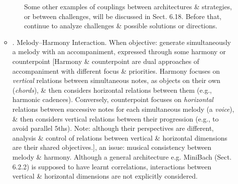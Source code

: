 \documentclass{article}
\begin{document}
\begin{itemize}
\begin{itemize}
\begin{itemize}
			Some other examples of couplings between architectures \& strategies, or between challenges, will be discussed in Sect. 6.18. Before that, continue to analyze challenges \& possible solutions or directions.
		\end{itemize}
		\item {. Melody--Harmony Interaction.} When objective: generate simultaneously a melody with an accompaniment, expressed through some harmony or counterpoint [Harmony \& counterpoint are dual approaches of accompaniment with different focus \& priorities. Harmony focuses on {\it vertical} relations between simultaneous notes, as objects on their own ({\it chords}), \& then considers horizontal relations between them (e.g., harmonic cadences). Conversely, counterpoint focuses on {\it horizontal} relations between successive notes for each simultaneous melody (a {\it voice}), \& then considers vertical relations between their progression (e.g., to avoid parallel 5ths). Note: although their perspectives are different, analysis \& control of relations between vertical \& horizontal dimensions are their shared objectives.], an issue: musical consistency between melody \& harmony. Although a general architecture e.g. MiniBach (Sect. 6.2.2) is supposed to have learnt correlations, interactions between vertical \& horizontal dimensions are not explicitly considered.
		

\end{itemize}
\end{itemize}
\end{document}
